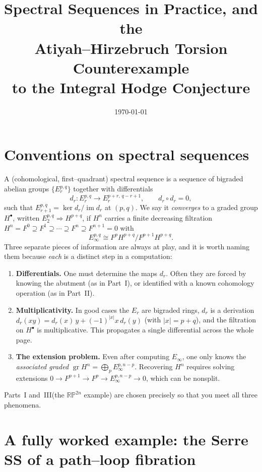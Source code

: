 \documentclass{article}
\title{Spectral Sequences in Practice, and the\\ Atiyah--Hirzebruch Torsion Counterexample\\ to the Integral Hodge Conjecture}
\author{\documentauthor}
\date{\today}
\renewcommand{\maketitle}{
    \quad
    \vspace{1em}
  \begin{center}
      \LARGE\bfseries \thetitle \par
      \vspace{0.6em}
      \large
  \end{center}
    \vspace{1em}
}
\newcommand{\RP}{\mathbb{RP}}
\newcommand{\gr}{\operatorname{gr}}
\begin{document}
\maketitle
\tableofcontents

\section{Conventions on spectral sequences}

A (cohomological, first--quadrant) spectral sequence is a sequence of bigraded
abelian groups $\{E_r^{p,q}\}$ together with differentials
\[
  d_r \colon E_r^{p,q}\to E_r^{p+r,\,q-r+1}, \qquad d_r\circ d_r=0,
\]
such that $E_{r+1}^{p,q}=\ker d_r/\operatorname{im} d_r$ at $(p,q)$. We say it
\emph{converges} to a graded group $H^\bullet$, written $E_2^{p,q}\Rightarrow
H^{p+q}$, if $H^n$ carries a finite decreasing filtration
$H^n=F^0\supseteq F^1\supseteq\cdots\supseteq F^{n}\supseteq F^{n+1}=0$ with
\[
  E_\infty^{p,q}\cong F^p H^{p+q}/F^{p+1}H^{p+q}.
\]
Three separate pieces of information are always at play, and it is worth naming
them because \emph{each} is a distinct step in a computation:

\begin{enumerate}
\item[(D)] \textbf{Differentials.} One must determine the maps $d_r$. Often they
are forced by knowing the abutment (as in Part~I), or identified with a known
cohomology operation (as in Part~II).
\item[(M)] \textbf{Multiplicativity.} In good cases the $E_r$ are bigraded rings,
$d_r$ is a derivation
$d_r(xy)=d_r(x)\,y+(-1)^{|x|}x\,d_r(y)$ (with $|x|=p+q$), and the filtration on
$H^\bullet$ is multiplicative. This propagates a single differential across the
whole page.
\item[(E)] \textbf{The extension problem.} Even after computing $E_\infty$, one
only knows the \emph{associated graded} $\gr H^n=\bigoplus_p E_\infty^{p,n-p}$.
Recovering $H^n$ requires solving extensions
$0\to F^{p+1}\to F^{p}\to E_\infty^{p,n-p}\to 0$, which can be nonsplit.
\end{enumerate}

Parts~I and~III(the $\RP^{2n}$ example) are chosen precisely so that you meet all
three phenomena.

\section{A fully worked example: the Serre SS of a path--loop fibration}
\end{document}

